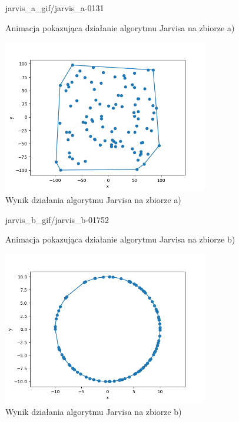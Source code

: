 \documentclass[a4paper]{article}
\begin{document}
\pagebreak
\begin{figure}[H]
    {jarvis_a_gif/jarvis_a-}{0}{131}
    \centering
    \caption{Animacja pokazująca działanie algorytmu Jarvisa na zbiorze a)}
    \label{fig:anim_jarvis_a}
\end{figure}

\begin{figure}[H]
    \centering
    \includegraphics[width=0.8\textwidth]{jarvis/jarvis_a_png.png}
    \caption{Wynik działania algorytmu Jarvisa na zbiorze a)}
    \label{fig:jarvis_a}
\end{figure}

\begin{figure}[H]
    {jarvis_b_gif/jarvis_b-}{0}{1752}
    \centering
    \caption{Animacja pokazująca działanie algorytmu Jarvisa na zbiorze b)}
    \label{fig:anim_jarvis_b}
\end{figure}

\begin{figure}[H]
    \centering
    \includegraphics[width=0.8\textwidth]{jarvis/jarvis_b_png.png}
    \caption{Wynik działania algorytmu Jarvisa na zbiorze b)}
    \label{fig:jarvis_b}
\end{figure}
\end{document}
